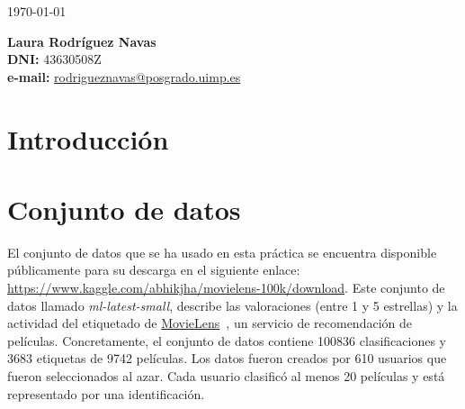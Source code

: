 \documentclass{uimppracticas}
\begin{document}
	
\frontmatter


\begin{center}
	\large \today
\end{center}

\vspace{40mm}

\begin{flushright}
	{\bf Laura Rodríguez Navas}\\
	\textbf{DNI:} 43630508Z\\
	\textbf{e-mail:} \href{rodrigueznavas@posgrado.uimp.es}{rodrigueznavas@posgrado.uimp.es}
\end{flushright}

\newpage

\tableofcontents

\newpage

\mainmatter

\setlength\parskip{2.5ex}

\section{Introducción}\label{introducción}

\newpage

\section{Conjunto de datos}

El conjunto de datos que se ha usado en esta práctica se encuentra disponible públicamente para su descarga en el siguiente enlace: \url{https://www.kaggle.com/abhikjha/movielens-100k/download}. Este conjunto de datos llamado \textit{ml-latest-small}, describe las valoraciones (entre 1 y 5 estrellas) y la actividad del etiquetado de \href{http://movielens.org}{MovieLens}~\cite{MovieLens}, un servicio de recomendación de películas. Concretamente, el conjunto de datos contiene 100836 clasificaciones y 3683 etiquetas de 9742 películas. Los datos fueron creados por 610 usuarios que fueron seleccionados al azar. Cada usuario clasificó al menos 20 películas y está representado por una identificación.
\end{document}
